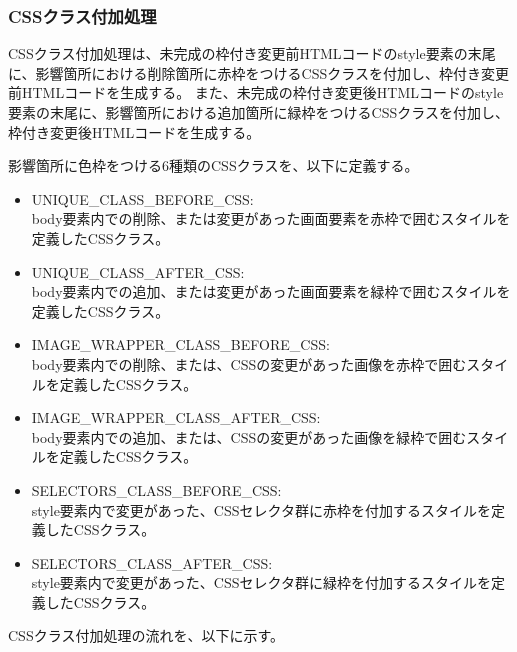\subsubsection{CSSクラス付加処理}\label{subsubsec: css_define}
CSSクラス付加処理は、未完成の枠付き変更前HTMLコードのstyle要素の末尾に、影響箇所における削除箇所に赤枠をつけるCSSクラスを付加し、枠付き変更前HTMLコードを生成する。
また、未完成の枠付き変更後HTMLコードのstyle要素の末尾に、影響箇所における追加箇所に緑枠をつけるCSSクラスを付加し、枠付き変更後HTMLコードを生成する。
\par
影響箇所に色枠をつける6種類のCSSクラスを、以下に定義する。
\begin{itemize}
    \setlength{\itemsep}{0pt}
          \setlength{\parsep}{0pt}
    \item UNIQUE\_CLASS\_BEFORE\_CSS:\\
          body要素内での削除、または変更があった画面要素を赤枠で囲むスタイルを定義したCSSクラス。
    \item UNIQUE\_CLASS\_AFTER\_CSS:\\
          body要素内での追加、または変更があった画面要素を緑枠で囲むスタイルを定義したCSSクラス。
    \item IMAGE\_WRAPPER\_CLASS\_BEFORE\_CSS:\\
          body要素内での削除、または、CSSの変更があった画像を赤枠で囲むスタイルを定義したCSSクラス。
    \item IMAGE\_WRAPPER\_CLASS\_AFTER\_CSS:\\
          body要素内での追加、または、CSSの変更があった画像を緑枠で囲むスタイルを定義したCSSクラス。
    \item SELECTORS\_CLASS\_BEFORE\_CSS:\\
          style要素内で変更があった、CSSセレクタ群に赤枠を付加するスタイルを定義したCSSクラス。
    \item SELECTORS\_CLASS\_AFTER\_CSS:\\
          style要素内で変更があった、CSSセレクタ群に緑枠を付加するスタイルを定義したCSSクラス。
\end{itemize}
\par
CSSクラス付加処理の流れを、以下に示す。
